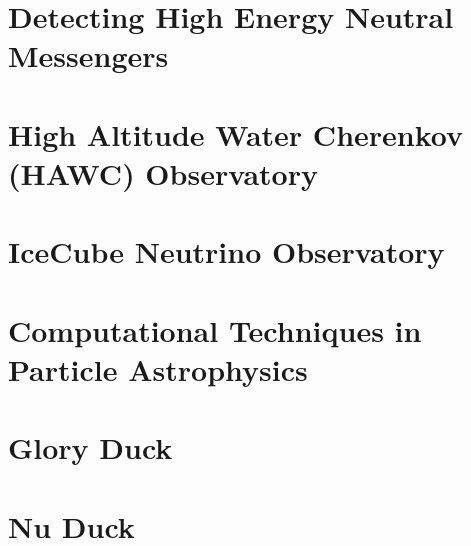 \documentclass[PhD]{msu-thesis}
\begin{document}
\chapter{Detecting High Energy Neutral Messengers\label{sec:multmessenger}}


\chapter{High Altitude Water Cherenkov (HAWC) Observatory\label{sec:hawc}}


\chapter{IceCube Neutrino Observatory\label{sec:ice3}}


\chapter{Computational Techniques in Particle Astrophysics}


\chapter{Glory Duck\label{sec:glory_duck}}

\chapter{Nu Duck\label{sec:nu_duck}}

\backmatter
\SingleSpacing
\printbibliography
\end{document}
